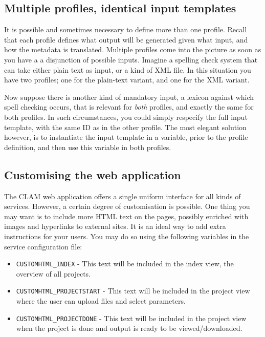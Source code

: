 \documentclass[a4paper,12pt]{report}
\begin{document}
\subsection{Multiple profiles, identical input templates}

It is possible and sometimes necessary to define more than one profile. Recall
that each profile defines what output will be generated given what input, and
how the metadata is translated. Multiple profiles come into the picture as soon
as you have a a disjunction of possible inputs. Imagine a spelling check system
that can take either plain text as input, or a kind of XML file. In this
situation you have two profiles; one for the plain-text variant, and one for
the XML variant. 

Now suppose there is another kind of mandatory input, a lexicon against which
spell checking occurs, that is relevant for \emph{both} profiles, and exactly
the same for both profiles. In such circumstances, you could simply respecify
the full input template, with the same ID as in the other profile. The most
elegant solution however, is to instantiate the input template in a variable,
prior to the profile definition, and then use this variable in both profiles.

\subsection{Customising the web application}

The CLAM web application offers a single uniform interface for all kinds of
services. However, a certain degree of customisation is possible. One thing you
may want is to include more HTML text on the pages, possibly enriched with
images and hyperlinks to external sites. It is an ideal way to add extra
instructions for your users. You may do so using the following variables in the
service configuration file:


\begin{itemize}
\item \texttt{CUSTOMHTML\_INDEX} - This text will be included in the index view, the overview of all projects.
\item \texttt{CUSTOMHTML\_PROJECTSTART} - This text will be included in the project view where the user can upload files and select parameters.
\item \texttt{CUSTOMHTML\_PROJECTDONE} - This text will be included in the project view when the project is done and output is ready to be viewed/downloaded.
\end{itemize}
\end{document}
